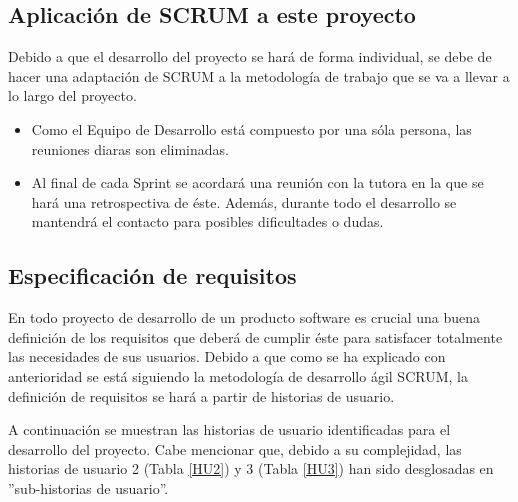 \subsection{Aplicación de SCRUM a este proyecto}
Debido a que el desarrollo del proyecto se hará de forma individual, se debe de hacer una adaptación de SCRUM a la metodología de trabajo que se va a llevar a lo largo del proyecto.

\begin{itemize}
    \item Como el Equipo de Desarrollo está compuesto por una sóla persona, las reuniones diaras son eliminadas.
    \item Al final de cada Sprint se acordará una reunión con la tutora en la que se hará una retrospectiva de éste. Además, durante todo el desarrollo se mantendrá el contacto para posibles dificultades o dudas.
\end{itemize}

\subsection{Especificación de requisitos}
En todo proyecto de desarrollo de un producto software es crucial una buena definición de los requisitos que deberá de cumplir éste para satisfacer totalmente las necesidades de sus usuarios. Debido a que como se ha explicado con anterioridad se está siguiendo la metodología de desarrollo ágil SCRUM, la definición de requisitos se hará a partir de historias de usuario. \bigskip

A continuación se muestran las historias de usuario identificadas para el desarrollo del proyecto. Cabe mencionar que, debido a su complejidad, las historias de usuario 2 (Tabla \ref{HU2}) y 3 (Tabla \ref{HU3}) han sido desglosadas en ''sub-historias de usuario''. 

